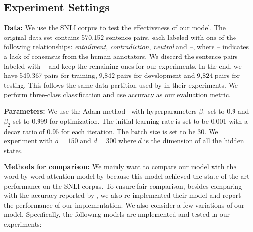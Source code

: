 \documentclass[11pt,letterpaper]{article}
\begin{document}
\subsection{Experiment Settings}

\noindent \textbf{Data:} We use the SNLI corpus to test the effectiveness of our model.
The original data set contains 570,152 sentence pairs, each labeled with one of the following relationships: \emph{entailment}, \emph{contradiction}, \emph{neutral} and \emph{--}, where \emph{--} indicates a lack of consensus from the human annotators.
We discard the sentence pairs labeled with \emph{--} and keep the remaining ones for our experiments.
In the end, we have 549,367 pairs for training, 9,842 pairs for development and 9,824 pairs for testing.
This follows the same data partition used by  in their experiments.
We perform three-class classification and use accuracy as our evaluation metric.



\noindent \textbf{Parameters:} We use the Adam method~\cite{kingma:arxiv14} with hyperparameters $\beta_1$ set to 0.9 and $\beta_2$ set to 0.999 for optimization.
The initial learning rate is set to be 0.001 with a decay ratio of 0.95 for each iteration.
The batch size is set to be 30.
We experiment with $d = 150$ and $d = 300$ where $d$ is the dimension of all the hidden states.


\noindent \textbf{Methods for comparison:} We mainly want to compare our model with the word-by-word attention model by  because this model achieved the state-of-the-art performance on the SNLI corpus.
To ensure fair comparison, besides comparing with the accuracy reported by , we also re-implemented their model and report the performance of our implementation.
We also consider a few variations of our model.
Specifically, the following models are implemented and tested in our experiments:
\end{document}
